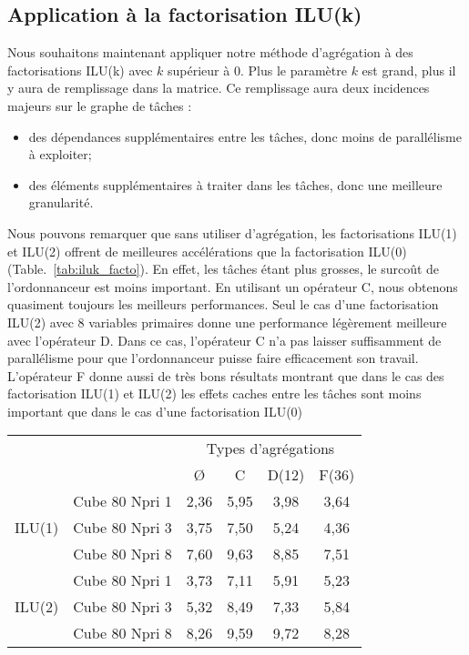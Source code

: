 \subsection{Application à la factorisation ILU(k)}
\label{sec:res_iluk}
Nous souhaitons maintenant appliquer notre méthode d'agrégation à des factorisations ILU(k) avec $k$ supérieur à 0.
%
Plus le paramètre $k$ est grand, plus il y aura de remplissage dans la matrice.
%
Ce remplissage aura deux incidences majeurs sur le graphe de tâches :
\begin{itemize}
  \item des dépendances supplémentaires entre les tâches, donc moins de parallélisme à exploiter;
  \item des éléments supplémentaires à traiter dans les tâches, donc une meilleure granularité.
\end{itemize}


Nous pouvons remarquer que sans utiliser d'agrégation, les factorisations ILU(1) et ILU(2) offrent de meilleures accélérations que la factorisation ILU(0) (Table.~\ref{tab:iluk_facto}).
%
En effet, les tâches étant plus grosses, le surcoût de l'ordonnanceur est moins important.
%
En utilisant un opérateur C, nous obtenons quasiment toujours les meilleurs performances.
%
Seul le cas d'une factorisation ILU(2) avec 8 variables primaires donne une performance légèrement meilleure avec l'opérateur D.
%
Dans ce cas, l'opérateur C n'a pas laisser suffisamment de parallélisme pour que l'ordonnanceur puisse faire efficacement son travail.
%
L'opérateur F donne aussi de très bons résultats montrant que dans le cas des factorisation ILU(1) et ILU(2) les effets caches entre les tâches sont moins important que dans le cas d'une factorisation ILU(0)

\begin{center}
  \begin{tabular}{|c|r|c|c|c|c|}
    \hline
       &   & \multicolumn{4}{|c|}{Types d'agrégations}\\
       &                & \O   &  C   & D(12) & F(36) \\
    \hline
       & Cube 80 Npri 1 & 2,36 & 5,95 & 3,98  & 3,64\\
ILU(1) & Cube 80 Npri 3 & 3,75 & 7,50 & 5,24  & 4,36\\
       & Cube 80 Npri 8 & 7,60 & 9,63 & 8,85  & 7,51\\
    \hline
       & Cube 80 Npri 1 & 3,73 & 7,11 & 5,91  & 5,23\\
ILU(2) & Cube 80 Npri 3 & 5,32 & 8,49 & 7,33  & 5,84\\
       & Cube 80 Npri 8 & 8,26 & 9,59 & 9,72  & 8,28\\
    \hline
  \end{tabular}
  \label{tab:iluk_facto}
\end{center}
